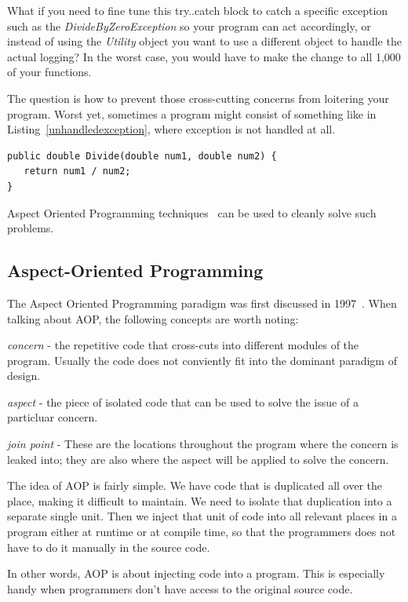 What if you need to fine tune this try..catch block to catch a specific exception such as the {\em DivideByZeroException} so your program can act accordingly, or instead of using the {\em Utility} object you want to use a different object to handle the actual logging? In the worst case, you would have to make the change to all 1,000 of your functions.

The question is how to prevent those cross-cutting concerns from loitering your program. Worst yet, sometimes a program might consist of something like in Listing~\ref{unhandledexception}, where exception is not handled at all.

\begin{lstlisting}[caption={Unhandle exception}, label=unhandledexception]
public double Divide(double num1, double num2) {
   return num1 / num2;
}
\end{lstlisting}

Aspect Oriented Programming techniques~\cite{aop} can be used to cleanly solve such problems.

\subsection{Aspect-Oriented Programming}
The Aspect Oriented Programming paradigm was first discussed in 1997~\cite{aop}. When talking about AOP, the following concepts are worth noting:

{\em concern} - the repetitive code that cross-cuts into different modules of the program. Usually the code does not conviently fit into the dominant paradigm of design.

{\em aspect} - the piece of isolated code that can be used to solve the issue of a particluar concern.

{\em join point} - These are the locations throughout the program where the concern is leaked into; they are also where the aspect will be applied to solve the concern.

The idea of AOP is fairly simple. We have code that is duplicated all over the place, making it difficult to maintain. We need to isolate that duplication into a separate single unit. Then we inject that unit of code into all relevant places in a program either at runtime or at compile time, so that the programmers does not have to do it manually in the source code.

In other words, AOP is about injecting code into a program. This is especially handy when programmers don't have access to the original source code.

